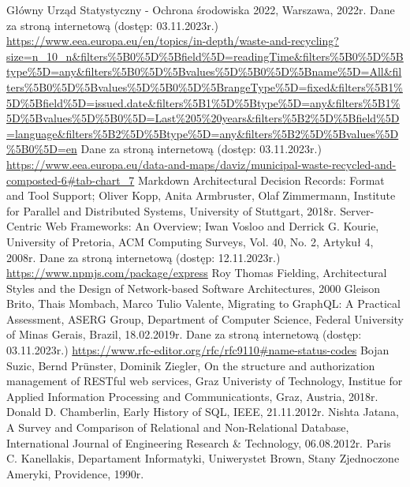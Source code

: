 \documentclass[12pt, a4paper, twoside, openany]{book}
\begin{document}
\begin{thebibliography}{9}
     Główny Urząd Statystyczny - Ochrona środowiska 2022, Warszawa, 2022r.
     Dane za stroną internetową (dostęp: 03.11.2023r.) \url{https://www.eea.europa.eu/en/topics/in-depth/waste-and-recycling?size=n_10_n&filters%5B0%5D%5Bfield%5D=readingTime&filters%5B0%5D%5Btype%5D=any&filters%5B0%5D%5Bvalues%5D%5B0%5D%5Bname%5D=All&filters%5B0%5D%5Bvalues%5D%5B0%5D%5BrangeType%5D=fixed&filters%5B1%5D%5Bfield%5D=issued.date&filters%5B1%5D%5Btype%5D=any&filters%5B1%5D%5Bvalues%5D%5B0%5D=Last%205%20years&filters%5B2%5D%5Bfield%5D=language&filters%5B2%5D%5Btype%5D=any&filters%5B2%5D%5Bvalues%5D%5B0%5D=en}
     Dane za stroną internetową (dostęp: 03.11.2023r.) \url{https://www.eea.europa.eu/data-and-maps/daviz/municipal-waste-recycled-and-composted-6#tab-chart_7}
     Markdown Architectural Decision Records: Format and Tool Support; Oliver Kopp, Anita Armbruster, Olaf Zimmermann, Institute for Parallel and Distributed Systems, University of Stuttgart, 2018r.
     Server-Centric Web Frameworks: An Overview; Iwan Vosloo and Derrick G. Kourie, University of Pretoria, ACM Computing Surveys, Vol. 40, No. 2, Artykuł 4, 2008r.
     Dane za stroną internetową (dostęp: 12.11.2023r.) \url{https://www.npmjs.com/package/express}
     Roy Thomas Fielding, Architectural Styles and the Design of Network-based Software Architectures, 2000
     Gleison Brito, Thais Mombach, Marco Tulio Valente, Migrating to GraphQL: A Practical Assessment, ASERG Group, Department of Computer Science, Federal University of Minas Gerais, Brazil, 18.02.2019r.
     Dane za stroną internetową (dostęp: 03.11.2023r.) \url{https://www.rfc-editor.org/rfc/rfc9110#name-status-codes}
     Bojan Suzic, Bernd Prünster, Dominik Ziegler, On the structure and authorization management of RESTful web services, Graz Univeristy of Technology, Institue for Applied Information Processing and Communicationts, Graz, Austria, 2018r.
     Donald D. Chamberlin, Early History of SQL, IEEE, 21.11.2012r.
     Nishta Jatana, A Survey and Comparison of Relational and Non-Relational Database, International Journal of Engineering Research \& Technology, 06.08.2012r.
     Paris C. Kanellakis, Departament Informatyki, Uniwerystet Brown, Stany Zjednoczone Ameryki, Providence, 1990r.

\end{thebibliography}
\end{document}
